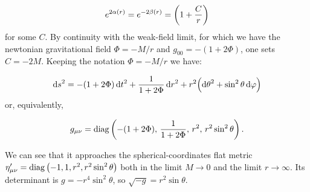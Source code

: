 \documentclass[main.tex]{subfiles}
\begin{document}
\begin{equation}
  e^{2 \alpha(r)} = e^{-2 \beta(r)} = \qty(1 + \frac{C}{r})
\end{equation}
for some \(C\). By continuity with the weak-field limit, for which we have the newtonian gravitational field \(\Phi = -M/r\) and \(g_{00} = - (1 + 2 \Phi)\), one sets \(C = -2M\).
Keeping the notation \(\Phi = -M/r\) we have:

\begin{equation}
    \dd{s}^2 = -(1+2\Phi)\dd{t}^2 + \frac{1}{1+2\Phi} \dd{r}^2
    + r^2 \qty(\dd{\theta}^2 + \sin^2\theta \dd{\varphi}) \label{eq:schwartzshild-line-element}
\end{equation}
or, equivalently,

\begin{equation}
    g_{\mu\nu} =  \diag\qty(-(1+2\Phi),\, \frac{1}{1+2\Phi},\, r^2,\, r^2 \sin ^2 \theta ) \,.
\end{equation}

We can see that it approaches the spherical-coordinates flat metric $\eta_{\mu\nu} ^{\prime} = \operatorname{diag}\qty(-1, 1, r^2, r^2 \sin ^2 \theta)$ both in the limit $M\rightarrow 0$ and the limit \(r \rightarrow \infty\). Its determinant is $g = -r^4 \sin^2 \theta$, so \(\sqrt{-g} = r^2 \sin \theta \).
\end{document}

